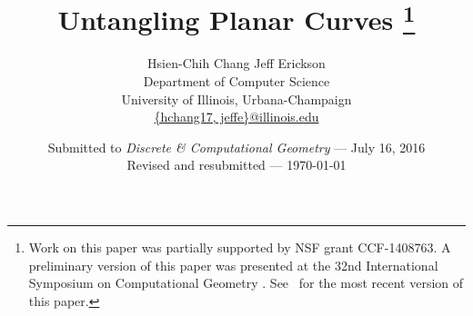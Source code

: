 \documentclass[11pt,twoside]{article}
\numberwithin{figure}{section}
\begin{document}
\begin{titlepage}

\title{Untangling Planar Curves%
\thanks{Work on this paper was partially supported by NSF grant CCF-1408763.  A preliminary version of this paper was presented at the 32nd International Symposium on Computational Geometry \cite{tangle}.  See \paperURL\ for the most recent version of this paper.}}

\author{Hsien-Chih Chang \qquad Jeff Erickson\\[1ex]
Department of Computer Science\\
University of Illinois, Urbana-Champaign\\
\href{mailto:hchang17@illinois.edu,jeffe@illinois.edu}{\{hchang17, jeffe\}@illinois.edu}}

%
%



\date{Submitted to \emph{Discrete \& Computational Geometry} --- July 16, 2016
\\[1ex]
Revised and resubmitted --- \today}

\maketitle


\end{titlepage}
\end{document}
